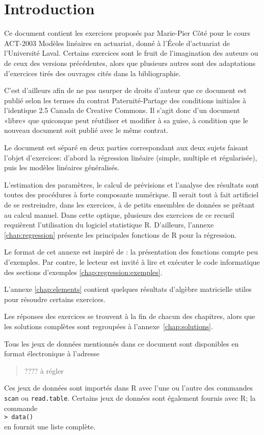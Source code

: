 \chapter*{Introduction}


Ce document contient les exercices proposés par Marie-Pier Côté pour le cours ACT-2003 Modèles linéaires en actuariat, donné à l'École d'actuariat de l'Université Laval. Certains exercices sont le fruit de l'imagination des auteurs ou de ceux des versions précédentes, alors que plusieurs autres sont des adaptations d'exercices tirés des ouvrages cités dans la bibliographie.

C'est d'ailleurs afin de ne pas usurper de droits d'auteur que ce document est publié selon les termes du contrat Paternité-Partage des conditions initiales à l’identique 2.5
Canada de Creative Commons. Il s'agit donc d'un document «libre» que quiconque peut réutiliser et modifier à sa guise, à condition que le nouveau document soit publié avec le même contrat.

Le document est séparé en deux parties correspondant aux deux sujets faisant l'objet d'exercices: d'abord la régression linéaire (simple, multiple et régularisée), puis les modèles linéaires généralisés.

L'estimation des paramètres, le calcul de prévisions et l'analyse des résultats sont toutes des procédures à forte composante numérique. Il serait tout à fait artificiel de se restreindre, dans les exercices, à de petits ensembles de données se prêtant au calcul manuel. Dans cette optique, plusieurs des exercices de ce recueil requièrent l'utilisation du logiciel statistique \textsf{R}.
D'ailleurs, l'annexe \ref{chap:regression} présente les principales fonctions de \textsf{R} pour la régression.

Le format de cet annexe est inspiré de %
{\shorthandoff{:} \citet{Goulet:introS:2007}}%
: la présentation des fonctions compte peu d'exemples. Par contre, le
lecteur est invité à lire et exécuter le code informatique des
sections d'exemples \ref{chap:regression:exemples}. 

L'annexe \ref{chap:elements} contient quelques résultats d'algèbre matricielle utiles pour résoudre certains exercices.

Les réponses des exercices se trouvent à la fin de chacun des
chapitres, alors que les solutions complètes sont regroupées à
l'annexe~\ref{chap:solutions}.

Tous les jeux de données mentionnés dans ce document sont disponibles en format électronique à l'adresse 
\begin{quote}
  ???? à régler
\end{quote}
Ces jeux de données sont importés dans \textsf{R} avec l'une ou l'autre des commandes \texttt{scan} ou \texttt{read.table}. Certains jeux de données sont également fournis avec \textsf{R}; la commande \\
\texttt{> data()}\\
en fournit une liste complète.

